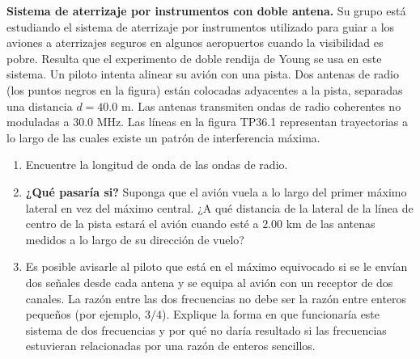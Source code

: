 \item \textbf{Sistema de aterrizaje por instrumentos con doble antena.}
Su grupo está estudiando el sistema de aterrizaje por instrumentos utilizado para guiar a los aviones a aterrizajes seguros en algunos aeropuertos cuando la visibilidad es pobre. Resulta que el experimento de doble rendija de Young se usa en este sistema. Un piloto intenta alinear su avión con una pista. Dos antenas de radio (los puntos negros en la figura) están colocadas adyacentes a la pista, separadas una distancia $d = 40.0\text{ m}$. Las antenas transmiten ondas de radio coherentes no moduladas a $30.0\text{ MHz}$. Las líneas en la figura TP36.1 representan trayectorias a lo largo de las cuales existe un patrón de interferencia máxima.
\begin{enumerate}
    \item Encuentre la longitud de onda de las ondas de radio.
    \item \textbf{¿Qué pasaría si?} Suponga que el avión vuela a lo largo del primer máximo lateral en vez del máximo central. ¿A qué distancia de la lateral de la línea de centro de la pista estará el avión cuando esté a $2.00\text{ km}$ de las antenas medidos a lo largo de su dirección de vuelo?
    \item Es posible avisarle al piloto que está en el máximo equivocado si se le envían dos señales desde cada antena y se equipa al avión con un receptor de dos canales. La razón entre las dos frecuencias no debe ser la razón entre enteros pequeños (por ejemplo, $3/4$). Explique la forma en que funcionaría este sistema de dos frecuencias y por qué no daría resultado si las frecuencias estuvieran relacionadas por una razón de enteros sencillos.
\end{enumerate}